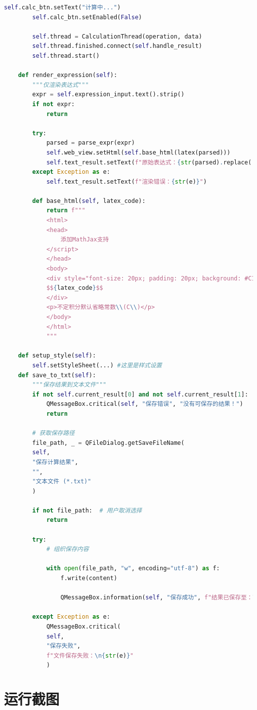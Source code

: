 \documentclass[UTF8,12pt]{ctexart}
\begin{document}
\begin{lstlisting}[language=Python]
		self.calc_btn.setText("计算中...")
		self.calc_btn.setEnabled(False)
		
		self.thread = CalculationThread(operation, data)
		self.thread.finished.connect(self.handle_result)
		self.thread.start()
	
	def render_expression(self):
		"""仅渲染表达式"""
		expr = self.expression_input.text().strip()
		if not expr:
			return
	
		try:
			parsed = parse_expr(expr)
			self.web_view.setHtml(self.base_html(latex(parsed)))
			self.text_result.setText(f"原始表达式：{str(parsed).replace('**', '^')}")
		except Exception as e:
			self.text_result.setText(f"渲染错误：{str(e)}")
		
		def base_html(self, latex_code):
			return f"""
			<html>
			<head>
				添加MathJax支持
			</script>
			</head>
			<body>
			<div style="font-size: 20px; padding: 20px; background: #C1FFC1;">
			$${latex_code}$$
			</div>
			<p>不定积分默认省略常数\\(C\\)</p>
			</body>
			</html>
			"""
	
	def setup_style(self):
		self.setStyleSheet(...) #这里是样式设置
	def save_to_txt(self):
		"""保存结果到文本文件"""
		if not self.current_result[0] and not self.current_result[1]:
			QMessageBox.critical(self, "保存错误", "没有可保存的结果！")
			return
		
		# 获取保存路径
		file_path, _ = QFileDialog.getSaveFileName(
		self,
		"保存计算结果",
		"",
		"文本文件 (*.txt)"
		)
	
		if not file_path:  # 用户取消选择
			return
		
		try:
			# 组织保存内容
			
			with open(file_path, "w", encoding="utf-8") as f:
				f.write(content)
			
				QMessageBox.information(self, "保存成功", f"结果已保存至：\n{file_path}")
		
		except Exception as e:
			QMessageBox.critical(
			self,
			"保存失败",
			f"文件保存失败：\n{str(e)}"
			)
	\end{lstlisting}
	\section{运行截图}
	
\end{document}
